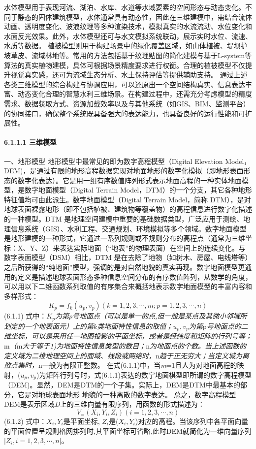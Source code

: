 水体模型用于表现河流、湖泊、水库、水道等水域要素的空间形态与动态变化。不同于静态的固体建筑模型，水体通常具有动态性，因此在三维建模中，需结合流体动画、透明度变化、波浪纹理等多种渲染技术，模拟真实的水流流动、水位变化和水面反光效果。此外，水体模型还可与水文模拟系统联动，展示实时水位、流速、水质等数据。 植被模型则用于构建场景中的绿化覆盖区域，如山体植被、堤坝护坡草皮、流域林地等。常用的方法包括基于纹理贴图的简化建模与基于L-system等算法的真实植物建模，具体可根据场景精度要求进行权衡。合理的植被模型不仅提升视觉真实感，还可为流域生态分析、水土保持评估等提供辅助支持。 通过上述各类三维模型的综合构建与协调应用，可以还原出一个空间结构真实、信息表达丰富、动态变化合理的智慧水利三维场景。在构建过程中，还需充分考虑模型的精度需求、数据获取方式、资源加载效率以及与其他系统（如GIS、BIM、监测平台）的协同接口，确保整个系统既具备强大的表达能力，也具备良好的运行性能和可扩展性。 \paragraph{6.1.1.1 三维模型}\label{ux4e09ux7ef4ux6a21ux578b} 一、地形模型 地形模型中最常见的即为数字高程模型（Digital Elevation Model，DEM)，是通过有限的地形高程数据实现对地面地形的数字化模拟（即地形表面形态的数字化表达）。它是用一组有序数值阵列形式表示地面高程的一种实体地面模型，是数字地面模型（Digital Terrain Model，DTM）的一个分支，其它各种地形特征值均可由此派生。数字地面模型（Digital Terrain Model，简称 DTM），是对地球表面裸露地形（即不包括植被、建筑物等覆盖物）的高程信息进行数字化描述的一种模型。DTM 是地理空间建模中重要的基础数据类型，广泛应用于测绘、地理信息系统（GIS）、水利工程、交通规划、环境模拟等多个领域。数字地面模型是地形建模的一种形式，它通过一系列规则或不规则分布的高程点（通常为三维坐标：X、Y、Z）来表达实际地面（``地表''的物理表面）在空间上的连续变化。与数字表面模型（DSM）相比，DTM 是在去除了地物（如树木、房屋、电线塔等）之后所获得的``纯地面''模型，强调的是对自然地貌的真实再现。数字地面模型更通用的定义是描述地球表面形态多种信息空间分布的有序数值阵列，从数学的角度，可以用以下二维函数系列取值的有序集合来概括地表示数字地面模型的丰富内容和多样形式： \[ K_p = f_k(u_p,v_p)(k=1,2,3,\cdots,m;p=1,2,3,\cdots,n) \] (6.1.1) 式中：\emph{\(K_p\)为第}\(p\)\emph{号地面点（可以是单一的点,但一般是某点及其微小邻域所划定的一个地表面元）上的第}\(k\)\emph{类地面特性信息的取值；\(u_p,v_p\)为第}p\emph{号地面点的二维坐标，可以是采用任一地图投影的平面坐标，或者是经纬度和矩阵的行列号等；}m\emph{（}m\emph{大于等于1)为地面特性信息类型的数目；}n\emph{为地面点的个数。当上述函数的定义域为二维地理空间上的面域、线段或网络时，}n\emph{趋于正无穷大；当定义城为离散点集时，}n一般为有限正整数。 在式(6.1.1)中，当\emph{m}=1且人为对地面高程的映射，(\(u_p,v_p\))为矩阵行列号时，式(6.1.1)表达的数宁地面棋型即所谓的数字高程模型（DEM)。显然，DEM是DTM的一个子集。实际上，DEM是DTM中最基本的部分，它是对地球表面地形 地貌的一种离散的数字表达。 总之，数字高程模型DEM是表示区域\emph{D}上的三维向量有限序列，用函数的形式描述为： \[ V_=(X_i,Y_i,Z_i)(i=1,2,3,\cdots,n) \] (6.1.2) 式中：\(X_i,Y_i\)是平面坐标, \(Z_i\)是(\(X_i,Y_i\))对应的高程。当该序列中各平面向量的平面位置呈规则格网排列时,其平面坐标可省略,此时DEM就简化为一维向量序列\(|Z_i,i=1,2,3,\cdots,n|\)。 